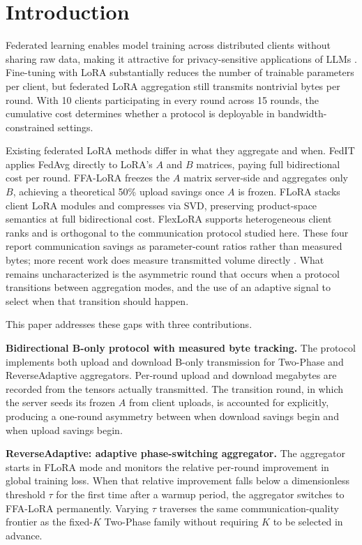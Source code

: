 \section{Introduction}
\label{sec:intro}

Federated learning enables model training across distributed clients without sharing raw data, making it attractive for privacy-sensitive applications of LLMs \citep{kairouz2021advances}. Fine-tuning with LoRA \citep{hu2022lora} substantially reduces the number of trainable parameters per client, but federated LoRA aggregation still transmits nontrivial bytes per round. With 10 clients participating in every round across 15 rounds, the cumulative cost determines whether a protocol is deployable in bandwidth-constrained settings.

Existing federated LoRA methods differ in what they aggregate and when. FedIT \citep{zhang2024federatedgpt} applies FedAvg \citep{mcmahan2017communication} directly to LoRA's $A$ and $B$ matrices, paying full bidirectional cost per round. FFA-LoRA \citep{sun2024ffalora} freezes the $A$ matrix server-side and aggregates only $B$, achieving a theoretical 50\% upload savings once $A$ is frozen. FLoRA \citep{wang2024flora} stacks client LoRA modules and compresses via SVD, preserving product-space semantics at full bidirectional cost. FlexLoRA \citep{bai2024flexlora} supports heterogeneous client ranks and is orthogonal to the communication protocol studied here. These four report communication savings as parameter-count ratios rather than measured bytes; more recent work does measure transmitted volume directly \citep{yan2026fedsrd,ramesh2026florist}. What remains uncharacterized is the asymmetric round that occurs when a protocol transitions between aggregation modes, and the use of an adaptive signal to select when that transition should happen.

This paper addresses these gaps with three contributions.

\textbf{Bidirectional B-only protocol with measured byte tracking.}
The protocol implements both upload and download B-only transmission for Two-Phase and ReverseAdaptive aggregators. Per-round upload and download megabytes are recorded from the tensors actually transmitted. The transition round, in which the server seeds its frozen $A$ from client uploads, is accounted for explicitly, producing a one-round asymmetry between when download savings begin and when upload savings begin.

\textbf{ReverseAdaptive: adaptive phase-switching aggregator.}
The aggregator starts in FLoRA mode and monitors the relative per-round improvement in global training loss. When that relative improvement falls below a dimensionless threshold $\tau$ for the first time after a warmup period, the aggregator switches to FFA-LoRA permanently. Varying $\tau$ traverses the same communication-quality frontier as the fixed-$K$ Two-Phase family without requiring $K$ to be selected in advance.

